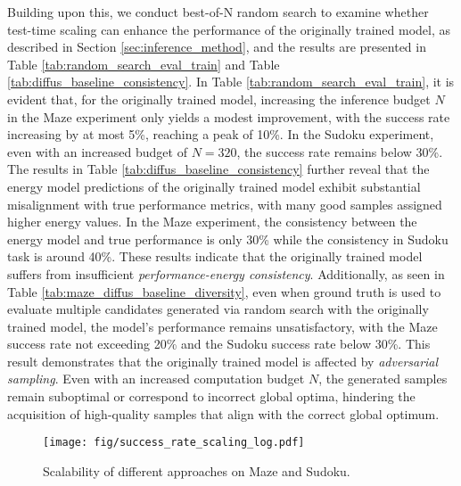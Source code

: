 Building upon this, we conduct best-of-N random search to examine whether test-time scaling can enhance the performance of the originally trained model, as described in Section \ref{sec:inference_method}, and the results are presented in Table \ref{tab:random_search_eval_train} and Table \ref{tab:diffus_baseline_consistency}. In Table \ref{tab:random_search_eval_train}, it is evident that, for the originally trained model, increasing the inference budget $N$ in the Maze experiment only yields a modest improvement, with the success rate increasing by at most 5\%, reaching a peak of 10\%. In the Sudoku experiment, even with an increased budget of $N = 320$, the success rate remains below 30\%. The results in Table \ref{tab:diffus_baseline_consistency} further reveal that the energy model predictions of the originally trained model exhibit substantial misalignment with true performance metrics, with many good samples assigned higher energy values. In the Maze experiment, the consistency between the energy model and true performance is only 30\% while the consistency in Sudoku task is around 40\%. These results indicate that the originally trained model suffers from insufficient \emph{performance-energy consistency}. Additionally, as seen in Table \ref{tab:maze_diffus_baseline_diversity}, even when ground truth is used to evaluate multiple candidates generated via random search with the originally trained model, the model's performance remains unsatisfactory, with the Maze success rate not exceeding 20\% and the Sudoku success rate below 30\%. This result demonstrates that the originally trained model is affected by \emph{adversarial sampling}. Even with an increased computation budget \( N \), the generated samples remain suboptimal or correspond to incorrect global optima, hindering the acquisition of high-quality samples that align with the correct global optimum.
\begin{figure*}[h!]
\begin{center}
\centerline{\texttt{[image: fig/success\_rate\_scaling\_log.pdf]}}
\vskip -0.2in
\caption{Scalability of different approaches on Maze and Sudoku. }
\label{fig:maze_scaling}
\end{center}
\vskip -0.4in
\end{figure*}
